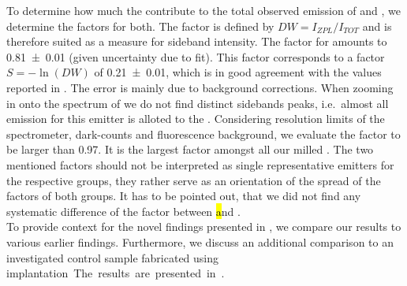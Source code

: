 	To determine how much the \ZPLs contribute to the total observed emission of \emnarrow and \embroad, we determine the \db factors for both.
	The \db factor is defined by $DW = I_{ZPL}/I_{TOT}$ and is therefore suited as a measure for sideband intensity.
	The \db factor for \emnarrow amounts to \num[separate-uncertainty]{0.81(1)} (given uncertainty due to fit).
	This \db factor corresponds to a \hr factor $S =- \ln{(DW)}$ \cite{Walker1979} of \num[separate-uncertainty]{0.21(1)}, which is in good agreement with the values reported in \cite{Neu2011b}.
	The error is mainly due to background corrections.
	When zooming in onto the spectrum of \embroad we do not find distinct sidebands peaks, i.e.\ almost all emission for this emitter is alloted to the \ZPL.
	Considering resolution limits of the spectrometer, dark-counts and fluorescence background, we evaluate the \db factor to be larger than \num[separate-uncertainty]{0.97}.
	It is the largest \db factor amongst all our milled \sivs.
	The two mentioned \db factors should not be interpreted as single representative emitters for the respective groups, they rather serve as an orientation of the spread of the \db factors of both groups.
	It has to be pointed out, that we did not find any systematic difference of the \db factor between \hl and \vl.
	\\
	To provide context for the novel findings presented in , we compare our results to various earlier findings.
	Furthermore, we discuss an additional comparison to an investigated control sample fabricated using \si implantation.
	The results are presented in .


